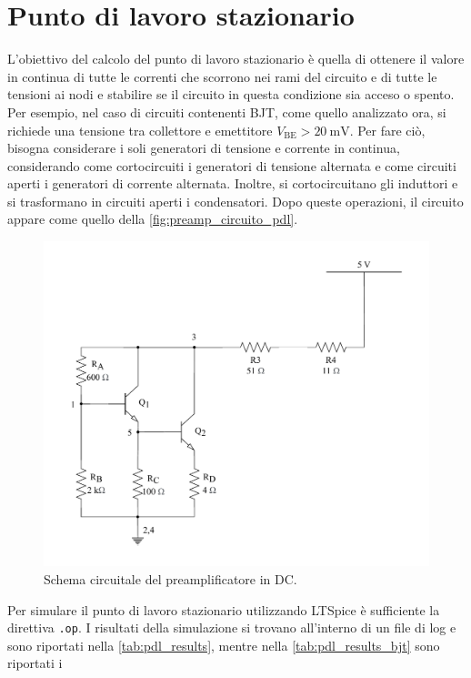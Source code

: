 \section{Punto di lavoro stazionario}
L'obiettivo del calcolo del punto di lavoro stazionario è quella di ottenere il valore in continua di tutte le correnti che scorrono nei rami del circuito 
e di tutte le tensioni ai nodi e stabilire se il circuito in questa condizione sia acceso o spento. Per esempio, nel caso di circuiti 
contenenti BJT, come quello analizzato ora, si richiede una tensione tra collettore e emettitore $V_{\text{BE}}>\SI{20}{\milli\volt}$.
Per fare ciò, bisogna considerare i soli generatori di tensione e corrente in continua, considerando come cortocircuiti i generatori di
tensione alternata e come circuiti aperti i generatori di corrente alternata. Inoltre, si cortocircuitano gli induttori e si trasformano in 
circuiti aperti i condensatori. Dopo queste operazioni, il circuito appare come quello della \autoref*{fig:preamp_circuito_pdl}.
\begin{figure}[h!]
    \centering
    \includegraphics[width=1\linewidth]{img/preamp_circuito_pdl.pdf}
    \caption{Schema circuitale del preamplificatore in DC.}
    \label{fig:preamp_circuito_pdl}
\end{figure}
Per simulare il punto di lavoro stazionario utilizzando LTSpice è sufficiente la direttiva \texttt{.op}. I risultati della simulazione si trovano
all'interno di un file di log e sono riportati nella \autoref*{tab:pdl_results}, mentre nella \autoref*{tab:pdl_results_bjt} sono riportati i 
